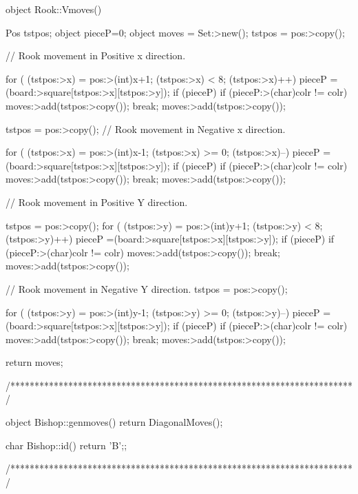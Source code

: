 object Rook::Vmoves()
{ Pos tstpos;
  object pieceP=0;
  object moves = Set:>new();
  tstpos = pos:>copy();

// Rook movement in Positive x direction.

  for ( (tstpos:>x) = pos:>(int)x+1;
        (tstpos:>x) < 8; (tstpos:>x)++)
     { pieceP =(board:>square[tstpos:>x][tstpos:>y]);
      if (pieceP)
        { if (pieceP:>(char)colr != colr) moves:>add(tstpos:>copy());
          break;
        }
      moves:>add(tstpos:>copy());
     }

tstpos = pos:>copy();
// Rook movement in Negative x direction.

  for ( (tstpos:>x) = pos:>(int)x-1;
        (tstpos:>x) >= 0; (tstpos:>x)--)
     { pieceP =(board:>square[tstpos:>x][tstpos:>y]);
      if (pieceP)
        { if (pieceP:>(char)colr != colr) moves:>add(tstpos:>copy());
          break;
        }
      moves:>add(tstpos:>copy());
     }


// Rook movement in Positive Y direction.

tstpos = pos:>copy();
  for ( (tstpos:>y) = pos:>(int)y+1;
        (tstpos:>y) < 8; (tstpos:>y)++)
     { pieceP =(board:>square[tstpos:>x][tstpos:>y]);
      if (pieceP)
        { if (pieceP:>(char)colr != colr) moves:>add(tstpos:>copy());
          break;
        }
      moves:>add(tstpos:>copy());
     }

// Rook movement in Negative Y direction.
tstpos = pos:>copy();

  for ( (tstpos:>y) = pos:>(int)y-1;
        (tstpos:>y) >= 0; (tstpos:>y)--)
     { pieceP =(board:>square[tstpos:>x][tstpos:>y]);
      if (pieceP)
        { if (pieceP:>(char)colr != colr) moves:>add(tstpos:>copy());
          break;
        }
      moves:>add(tstpos:>copy());
     }

return moves;
}

/***********************************************************************/

object Bishop::genmoves()
{ return DiagonalMoves(); }

char Bishop::id() {return 'B';};

/***********************************************************************/


